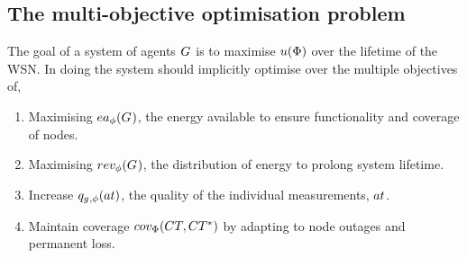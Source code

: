 \subsection{The multi-objective optimisation problem}
\label{section:optimisation_problem}

The goal of a system of agents $G_{}^{}$ is to maximise $\functionSystemUtility{}{}$ over the lifetime of the WSN. In doing the system should   implicitly optimise over the multiple objectives of,
\begin{enumerate}
	\item Maximising $\functionEnergyAvailable{}{}$, the energy available to ensure functionality and coverage of nodes.
	\item Maximising $\functionEnergyVariability{}{}$,  the distribution of energy to prolong system lifetime.
	\item Increase $\functionAtomicTaskQualitySignature{}{}$, the quality of the individual measurements, $\varAtomicTask{}{}$.
	\item Maintain coverage $\functionSystemCoverage{}{}$ by adapting to node outages and permanent loss.
\end{enumerate}